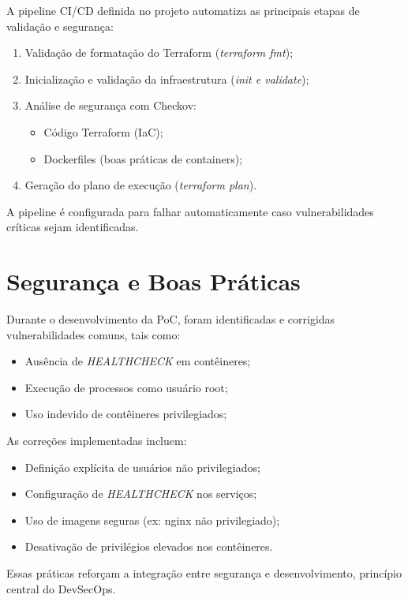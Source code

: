 A pipeline CI/CD definida no projeto automatiza as principais etapas de validação e segurança:

\begin{enumerate}
\item Validação de formatação do Terraform (\textit{terraform fmt});
\item Inicialização e validação da infraestrutura (\textit{init e validate});
\item Análise de segurança com Checkov:
\begin{itemize}
\item Código Terraform (IaC);
\item Dockerfiles (boas práticas de containers);
\end{itemize}
\item Geração do plano de execução (\textit{terraform plan}).
\end{enumerate}

A pipeline é configurada para falhar automaticamente caso vulnerabilidades críticas sejam identificadas.

\section{Segurança e Boas Práticas}

Durante o desenvolvimento da PoC, foram identificadas e corrigidas vulnerabilidades comuns, tais como:

\begin{itemize}
\item Ausência de \textit{HEALTHCHECK} em contêineres;
\item Execução de processos como usuário root;
\item Uso indevido de contêineres privilegiados;
\end{itemize}

As correções implementadas incluem:

\begin{itemize}
\item Definição explícita de usuários não privilegiados;
\item Configuração de \textit{HEALTHCHECK} nos serviços;
\item Uso de imagens seguras (ex: nginx não privilegiado);
\item Desativação de privilégios elevados nos contêineres.
\end{itemize}

Essas práticas reforçam a integração entre segurança e desenvolvimento, princípio central do DevSecOps.

